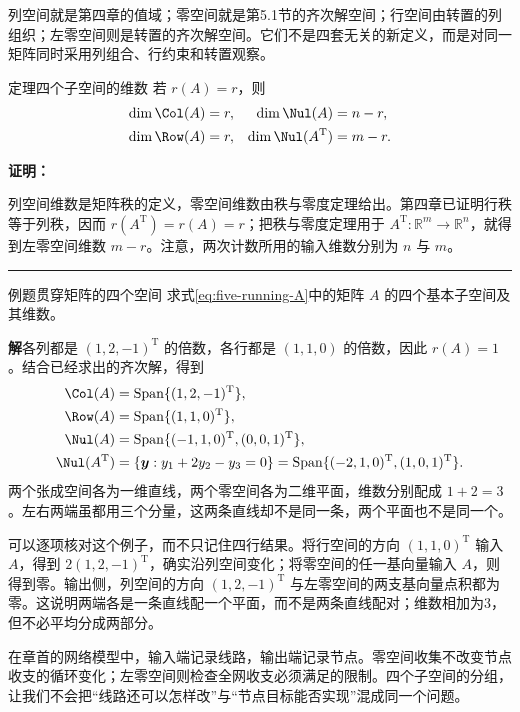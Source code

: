 \documentclass[a4paper,12pt,twoside,openany,fontset=none]{ctexbook}
\newcounter{theorem}[chapter]
\newenvironment{theorem}[1][]{\begin{thmBox}{定理}{#1}}{\end{thmBox}}
\newcounter{example}[chapter]
\newenvironment{example}[1][]{\begin{exBox}{例题}{#1}}{\end{exBox}}
\renewenvironment{proof}{
    \par\vspace{0.5em}\noindent
    \textbf{\color{LogicColor} 证明：}
}{
    \hfill \textcolor{LogicColor}{\rule{0.6em}{0.6em}} \par
}
\numberwithin{equation}{chapter}
\begin{document}
列空间就是第四章的值域；零空间就是第5.1节的齐次解空间；行空间由转置的列组织；左零空间则是转置的齐次解空间。它们不是四套无关的新定义，而是对同一矩阵同时采用列组合、行约束和转置观察。

\begin{theorem}[四个子空间的维数]
若 $r(A)=r$，则
\begin{align}
 \dim\Col(A)&=r,&\dim\Nul(A)&=n-r,\\
 \dim\Row(A)&=r,&\dim\Nul(A^{\mathrm T})&=m-r.
 \label{eq:five-four-dimensions}
\end{align}
\end{theorem}
\begin{proof}
列空间维数是矩阵秩的定义，零空间维数由秩与零度定理给出。第四章已证明行秩等于列秩，因而 $r(A^{\mathrm T})=r(A)=r$；把秩与零度定理用于 $A^{\mathrm T}:\mathbb R^m\to\mathbb R^n$，就得到左零空间维数 $m-r$。注意，两次计数所用的输入维数分别为 $n$ 与 $m$。
\end{proof}


\begin{example}[贯穿矩阵的四个空间]
求式\eqref{eq:five-running-A}中的矩阵 $A$ 的四个基本子空间及其维数。
\end{example}
\textbf{解}\quad 各列都是 $(1,2,-1)^{\mathrm T}$ 的倍数，各行都是 $(1,1,0)$ 的倍数，因此 $r(A)=1$。结合已经求出的齐次解，得到
\begin{align}
 \Col(A)&=\operatorname{Span}\{(1,2,-1)^{\mathrm T}\},\\
 \Row(A)&=\operatorname{Span}\{(1,1,0)^{\mathrm T}\},\\
 \Nul(A)&=\operatorname{Span}\{(-1,1,0)^{\mathrm T},(0,0,1)^{\mathrm T}\},\\
 \Nul(A^{\mathrm T})&=\{\boldsymbol y:y_1+2y_2-y_3=0\}
 =\operatorname{Span}\{(-2,1,0)^{\mathrm T},(1,0,1)^{\mathrm T}\}.
\end{align}
两个张成空间各为一维直线，两个零空间各为二维平面，维数分别配成 $1+2=3$。左右两端虽都用三个分量，这两条直线却不是同一条，两个平面也不是同一个。

可以逐项核对这个例子，而不只记住四行结果。将行空间的方向 $(1,1,0)^{\mathrm T}$ 输入 $A$，得到 $2(1,2,-1)^{\mathrm T}$，确实沿列空间变化；将零空间的任一基向量输入 $A$，则得到零。输出侧，列空间的方向 $(1,2,-1)^{\mathrm T}$ 与左零空间的两支基向量点积都为零。这说明两端各是一条直线配一个平面，而不是两条直线配对；维数相加为3，但不必平均分成两部分。

在章首的网络模型中，输入端记录线路，输出端记录节点。零空间收集不改变节点收支的循环变化；左零空间则检查全网收支必须满足的限制。四个子空间的分组，让我们不会把“线路还可以怎样改”与“节点目标能否实现”混成同一个问题。
\end{document}
